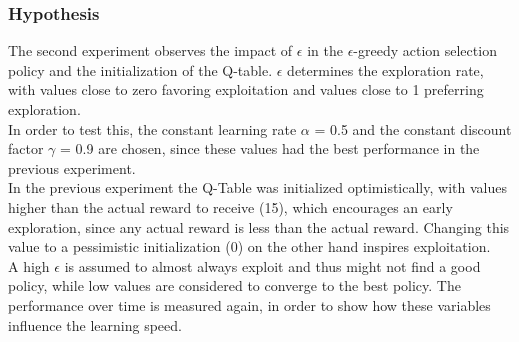 \documentclass[11pt]{article}
\begin{document}
\subsubsection{Hypothesis}
The second experiment observes the impact of $\epsilon$ in the $\epsilon$-greedy action selection policy and the initialization of the Q-table. $\epsilon$ determines the exploration rate, with values close to zero favoring exploitation and values close to 1 preferring exploration.\\
In order to test this, the constant learning rate $\alpha$ = 0.5 and the constant discount factor $\gamma$ = 0.9 are chosen, since these values had the best performance in the previous experiment.\\
In the previous experiment the Q-Table was initialized optimistically, with values higher than the actual reward to receive (15), which encourages an early exploration, since any actual reward is less than the actual reward. Changing this value to a pessimistic initialization (0) on the other hand inspires exploitation.\\
A high $\epsilon$ is assumed to almost always exploit and thus might not find a good policy, while low values are considered to converge to the best policy.
The performance over time is measured again, in order to show how these variables influence the learning speed.
\end{document}
